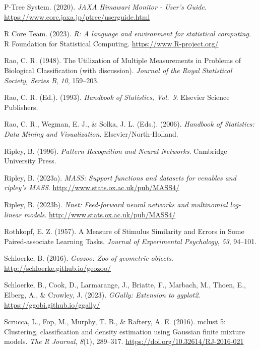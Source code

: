 \documentclass[
  letterpaper,
]{krantz}
\newlength{\cslhangindent}
\newenvironment{CSLReferences}[2] %
 {\begin{list}{}{%
  \setlength{\itemindent}{0pt}
  \setlength{\leftmargin}{0pt}
  \setlength{\parsep}{0pt}
  \ifodd #1
   \setlength{\leftmargin}{\cslhangindent}
   \setlength{\itemindent}{-1\cslhangindent}
  \fi
  \setlength{\itemsep}{#2\baselineskip}}}
 {\end{list}}
\begin{document}
\begin{CSLReferences}{1}{0}
P-Tree System. (2020). \emph{{JAXA Himawari Monitor - User's Guide}}.
\url{https://www.eorc.jaxa.jp/ptree/userguide.html}

R Core Team. (2023). \emph{R: A language and environment for statistical
computing}. R Foundation for Statistical Computing.
\url{https://www.R-project.org/}

Rao, C. R. (1948). The {U}tilization of {M}ultiple {M}easurements in
{P}roblems of {B}iological {C}lassification (with discussion).
\emph{Journal of the Royal Statistical Society, Series B}, \emph{10},
159--203.

Rao, C. R. (Ed.). (1993). \emph{{H}andbook of {S}tatistics, {V}ol.~9}.
Elsevier Science Publishers.

Rao, C. R., Wegman, E. J., \& Solka, J. L. (Eds.). (2006).
\emph{Handbook of {S}tatistics: {D}ata {M}ining and {V}isualization}.
Elsevier/North-Holland.

Ripley, B. (1996). \emph{Pattern {R}ecognition and {N}eural {N}etworks}.
Cambridge University Press.

Ripley, B. (2023a). \emph{MASS: Support functions and datasets for
venables and ripley's MASS}. \url{http://www.stats.ox.ac.uk/pub/MASS4/}

Ripley, B. (2023b). \emph{Nnet: Feed-forward neural networks and
multinomial log-linear models}.
\url{http://www.stats.ox.ac.uk/pub/MASS4/}

Rothkopf, E. Z. (1957). A {M}easure of {S}timulus {S}imilarity and
{E}rrors in {S}ome {P}aired-associate {L}earning {T}asks. \emph{Journal
of Experimental Psychology}, \emph{53}, 94--101.

Schloerke, B. (2016). \emph{Geozoo: Zoo of geometric objects}.
\url{http://schloerke.github.io/geozoo/}

Schloerke, B., Cook, D., Larmarange, J., Briatte, F., Marbach, M.,
Thoen, E., Elberg, A., \& Crowley, J. (2023). \emph{GGally: Extension to
ggplot2}. \url{https://ggobi.github.io/ggally/}

Scrucca, L., Fop, M., Murphy, T. B., \& Raftery, A. E. (2016). {mclust}
5: Clustering, classification and density estimation using {G}aussian
finite mixture models. \emph{The {R} Journal}, \emph{8}(1), 289--317.
\url{https://doi.org/10.32614/RJ-2016-021}


\end{CSLReferences}
\end{document}
